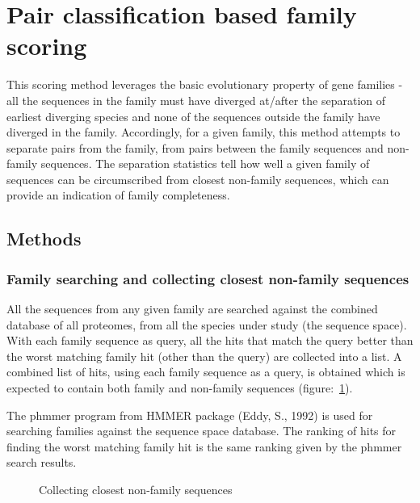 \documentclass{article}
\begin{document}
	\section{Pair classification based family scoring}
	This scoring method leverages the basic evolutionary property of gene families - all the sequences in the family must have diverged at/after the separation of earliest diverging species and none of the sequences outside the family have diverged in the family. Accordingly, for a given family, this method attempts to separate pairs from the family, from pairs between the family sequences and non-family sequences. The separation statistics tell how well a given family of sequences can be circumscribed from closest non-family sequences, which can provide an indication of family completeness.
		\subsection{Methods}
			\subsubsection{Family searching and collecting closest non-family sequences}
			All the sequences from any given family are searched against the combined database of all proteomes, from all the species under study (the sequence space). With each family sequence as query, all the hits that match the query better than the worst matching family hit (other than the query) are collected into a list. A combined list of hits, using each family sequence as a query, is obtained which is expected to contain both family and non-family sequences (figure:~\ref{fig:collecting_non_fam_seqs}).
			
			The phmmer program from HMMER package (Eddy, S., 1992) is used for searching families against the sequence space database. The ranking of hits for finding the worst matching family hit is the same ranking given by the phmmer search results. 
			\begin{figure}
				\caption{Collecting closest non-family sequences}
				\label{fig:collecting_non_fam_seqs}
			\end{figure}
			
\end{document}
